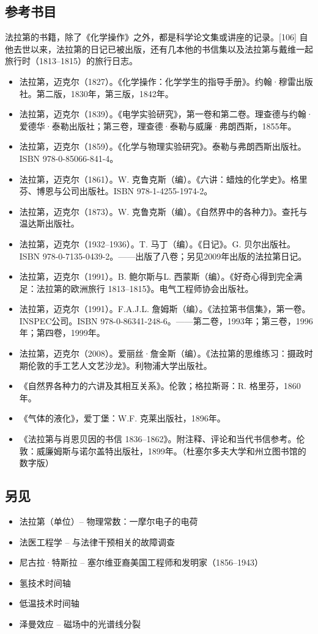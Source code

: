 \subsection{参考书目}
法拉第的书籍，除了《化学操作》之外，都是科学论文集或讲座的记录。[106] 自他去世以来，法拉第的日记已被出版，还有几本他的书信集以及法拉第与戴维一起旅行时（1813–1815）的旅行日志。
\begin{itemize}
\item 法拉第，迈克尔（1827）。《化学操作：化学学生的指导手册》。约翰·穆雷出版社。第二版，1830年，第三版，1842年。  
\item 法拉第，迈克尔（1839）。《电学实验研究》，第一卷和第二卷。理查德与约翰·爱德华·泰勒出版社；第三卷，理查德·泰勒与威廉·弗朗西斯，1855年。  
\item 法拉第，迈克尔（1859）。《化学与物理实验研究》。泰勒与弗朗西斯出版社。ISBN 978-0-85066-841-4。  
\item 法拉第，迈克尔（1861）。W. 克鲁克斯（编）。《六讲：蜡烛的化学史》。格里芬、博恩与公司出版社。ISBN 978-1-4255-1974-2。  
\item 法拉第，迈克尔（1873）。W. 克鲁克斯（编）。《自然界中的各种力》。查托与温达斯出版社。  
\item 法拉第，迈克尔（1932–1936）。T. 马丁（编）。《日记》。G. 贝尔出版社。ISBN 978-0-7135-0439-2。——出版了八卷；另见2009年出版的法拉第日记。  
\item 法拉第，迈克尔（1991）。B. 鲍尔斯与L. 西蒙斯（编）。《好奇心得到完全满足：法拉第的欧洲旅行 1813–1815》。电气工程师协会出版社。  
\item 法拉第，迈克尔（1991）。F.A.J.L. 詹姆斯（编）。《法拉第书信集》，第一卷。INSPEC公司。ISBN 978-0-86341-248-6。——第二卷，1993年；第三卷，1996年；第四卷，1999年。  
\item 法拉第，迈克尔（2008）。爱丽丝·詹金斯（编）。《法拉第的思维练习：摄政时期伦敦的手工艺人文艺沙龙》。利物浦大学出版社。  
\item 《自然界各种力的六讲及其相互关系》。伦敦；格拉斯哥：R. 格里芬，1860年。  
\item 《气体的液化》，爱丁堡：W.F. 克莱出版社，1896年。  
\item 《法拉第与肖恩贝因的书信 1836–1862》。附注释、评论和当代书信参考。伦敦：威廉姆斯与诺尔盖特出版社，1899年。（杜塞尔多夫大学和州立图书馆的数字版）
\end{itemize}
\subsection{另见}
\begin{itemize}
\item 法拉第（单位）– 物理常数：一摩尔电子的电荷
\item 法医工程学 – 与法律干预相关的故障调查
\item 尼古拉·特斯拉 – 塞尔维亚裔美国工程师和发明家（1856–1943）
\item 氢技术时间轴
\item 低温技术时间轴
\item 泽曼效应 – 磁场中的光谱线分裂
\end{itemize}

